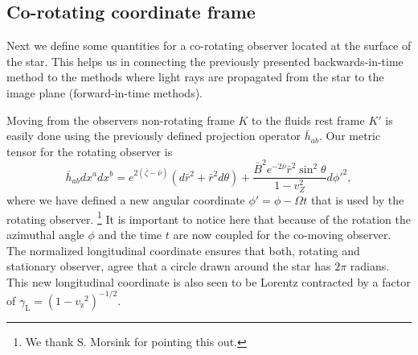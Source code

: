 \documentclass{aa}
\newcommand{\be}{\begin{equation}}
\newcommand{\ee}{\end{equation}}
\newcommand{\rb}{\ensuremath{\bar{r}}}
\newcommand{\nub}{\ensuremath{\bar{\nu}}}
\newcommand{\zetab}{\ensuremath{\bar{\zeta}}}
\newcommand{\Bb}{\ensuremath{\bar{B}}}
\newcommand{\vz}{\ensuremath{v_{\mathrm{z}}}}
\newcommand{\lgamma}{\gamma_{\text{L}}}
\begin{document}
\subsection{Co-rotating coordinate frame}\label{sect:coords}
Next we define some quantities for a co-rotating observer located at the surface of the star.
This helps us in connecting the previously presented backwards-in-time method to the methods where light rays are propagated from the star to the image plane (forward-in-time methods).

Moving from the observers non-rotating frame $K$ to the fluids rest frame $K'$ is easily done using the previously defined projection operator $\bar{h}_{ab}$. 
Our metric tensor for the rotating observer is 
\be
\bar{h}_{ab} dx^a dx^b = e^{2(\zetab - \nub)} (d\rb^2 + \rb^2 d\theta) + \frac{\Bb^2 e^{-2\nub} \rb^2 \sin^2\theta}{1-v_Z^2} d{\phi'}^{2},
\ee
where we have defined a new angular coordinate $\phi' = \phi - \Omega t$ that is used by the rotating observer.%
\footnote{We thank S. Morsink for pointing this out.}
It is important to notice here that because of the rotation the azimuthal angle $\phi$ and the time $t$ are now coupled for the co-moving observer.
The normalized longitudinal coordinate ensures that both, rotating and stationary observer, agree that a circle drawn around the star has $2\pi$ radians.
This new longitudinal coordinate is also seen to be Lorentz contracted by a factor of $\lgamma = (1-\vz^2)^{-1/2}$.
\end{document}
